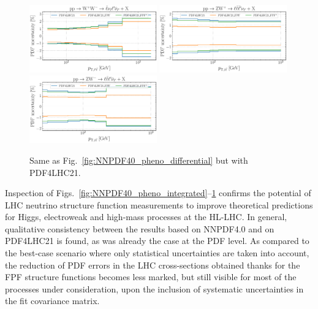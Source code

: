 \begin{figure}[htbp]
	\includegraphics[width=0.49\textwidth]{plots/LHCpheno/NNPDF_WPWM_14TEV_40_PHENO-global-pdf4lhc21.pdf}
	\includegraphics[width=0.49\textwidth]{plots/LHCpheno/NNPDF_WPZ_14TEV_40_PHENO-global-pdf4lhc21.pdf}
	\includegraphics[width=0.49\textwidth]{plots/LHCpheno/NNPDF_WMZ_14TEV_40_PHENO-global-pdf4lhc21.pdf}
	\caption{
		Same as Fig.~\ref{fig:NNPDF40_pheno_differential} but with PDF4LHC21.
	}
	\label{fig:PDF4LHC21_pheno_differential}
\end{figure}

Inspection of Figs.~\ref{fig:NNPDF40_pheno_integrated}--\ref{fig:PDF4LHC21_pheno_differential}
confirms the potential of LHC neutrino structure function measurements
to improve theoretical predictions for Higgs, electroweak and high-mass
processes at the HL-LHC.
%
In general, qualitative consistency between the results based on NNPDF4.0
and on PDF4LHC21 is found, as was already the case at the PDF level.
%
As  compared to the best-case scenario where only statistical uncertainties
are taken into account, the reduction of PDF errors in the LHC cross-sections
obtained thanks for the FPF structure functions becomes less marked,
but still visible for most of the processes under consideration,
upon the inclusion of systematic uncertainties in the fit covariance matrix.

